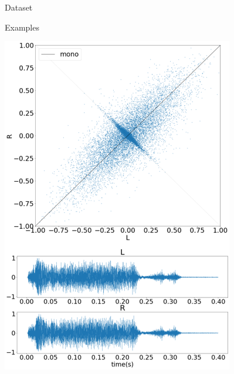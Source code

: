 \begin{frame}{Dataset}
\begin{block}{Examples}
\begin{minipage}{.24\textwidth}
        \includegraphics[width=0.9\linewidth]{Presentation/figures/dataset_example_5.png}
    \end{minipage}
    \end{block}
\end{frame}

